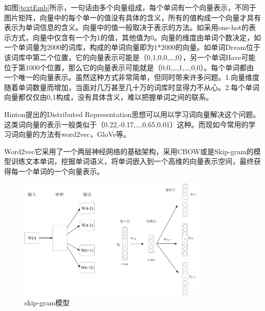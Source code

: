 如图\ref{textEmb}所示，一句话由多个向量组成，每个单词有一个向量表示，不同于图片矩阵，向量中的每个单一的值没有具体的含义，所有的值构成一个向量才具有表示为单词信息的含义。向量中的值一般取决于表示的方法。如采用one-hot的表示方式，向量中仅含有一个为1的值，其他值为0。向量的维度由单词个数决定，如一个单词量为2000的词库，构成的单词向量即为1*2000的向量。如单词Dream位于该词库中第二个位置，它的向量表示可能是（0,1,0,0,…,0），另一个单词Have可能位于第1000个位置，那么它的向量表示可能就是（0,0,…,1,…,0,0）。每个单词都由一个唯一的向量表示。虽然这种方式非常简单，但同时带来许多问题。1.向量维度随着单词数量而增加，当面对几万甚至几十万的词库时显得力不从心。2.每个单词向量都仅仅由0,1构成，没有具体含义，难以把握单词之间的联系。

Hinton提出的Distributed Representation思想可以用以学习词向量解决这个问题。这类词向量的表示一般类似于（0.22,-0.17,…,0.65,0.01）这种。而现如今常用的学习词向量的方法有word2vec，GloVe等。

Word2vec它采用了一个两层神经网络的基础架构，采用CBOW或是Skip-gram的模型训练文本单词，挖掘单词语义，将单词嵌入到一个高维的向量表示空间，最终获得每一个单词的一个向量表示。
\begin{figure}[htb]%
	\setlength{\belowcaptionskip}{0pt}
	\centering
	\includegraphics[width=0.8\textwidth]{pic/2-4.png}
	\caption{skip-gram模型}
	\label{skip-gram}
\end{figure}

